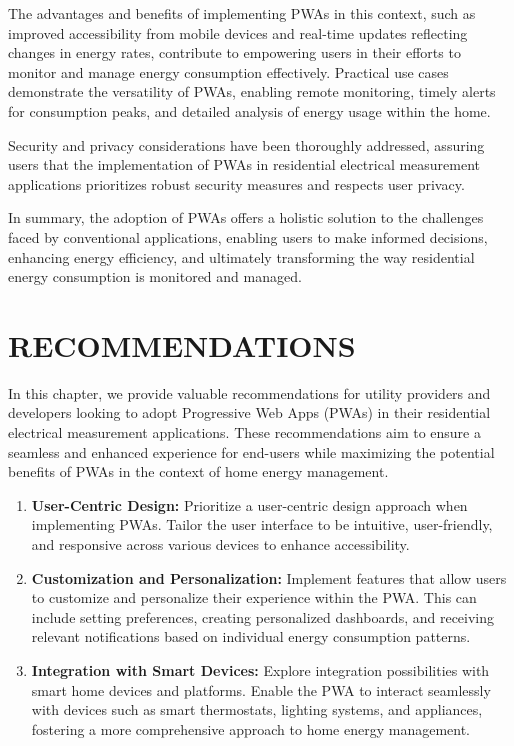 \documentclass{article}
\begin{document}
\begin{multicols}{2}
The advantages and benefits of implementing PWAs in this context, such as improved accessibility from mobile devices and real-time updates reflecting changes in energy rates, contribute to empowering users in their efforts to monitor and manage energy consumption effectively. Practical use cases demonstrate the versatility of PWAs, enabling remote monitoring, timely alerts for consumption peaks, and detailed analysis of energy usage within the home.



Security and privacy considerations have been thoroughly addressed, assuring users that the implementation of PWAs in residential electrical measurement applications prioritizes robust security measures and respects user privacy.



In summary, the adoption of PWAs offers a holistic solution to the challenges faced by conventional applications, enabling users to make informed decisions, enhancing energy efficiency, and ultimately transforming the way residential energy consumption is monitored and managed.
\section*{RECOMMENDATIONS}
In this chapter, we provide valuable recommendations for utility providers and developers looking to adopt Progressive Web Apps (PWAs) in their residential electrical measurement applications. These recommendations aim to ensure a seamless and enhanced experience for end-users while maximizing the potential benefits of PWAs in the context of home energy management.

\begin{enumerate}
    \item \textbf{User-Centric Design:} Prioritize a user-centric design approach when implementing PWAs. Tailor the user interface to be intuitive, user-friendly, and responsive across various devices to enhance accessibility.
    
    \item \textbf{Customization and Personalization:} Implement features that allow users to customize and personalize their experience within the PWA. This can include setting preferences, creating personalized dashboards, and receiving relevant notifications based on individual energy consumption patterns.
    
    \item \textbf{Integration with Smart Devices:} Explore integration possibilities with smart home devices and platforms. Enable the PWA to interact seamlessly with devices such as smart thermostats, lighting systems, and appliances, fostering a more comprehensive approach to home energy management.
    

\end{enumerate}
\end{multicols}
\end{document}
